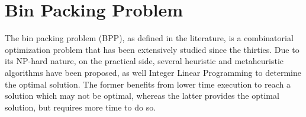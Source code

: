 \begin{comment}
    Another approach is to use linear goal programming, which allows to formulate a multi-objective problem into a standard linear programming problem by setting as constraints the target values for each of the multi-objective functions \cite[Chapter~4]{hillier2012introduction}. Although it might be a good approach to simplify a given problem, it requires a user to define a specific numeric goal for each of the objectives.
    
    Lastly, the pareto solution is another approach to multi-objective problems (MOP). This approach gathers the pareto front which consists of all optimal non-dominated solutions to a MOP. A solution $y$ is considered to dominate a solution $z$ if the evaluation of each objective function at y, is considered to be more optimal than when evaluated at $z$. In turn, a solution $y$ is considered to non-dominated by a solution $z$ when both are better than the other at one of the objective functions to be evaluated. These are the solutions that will make out the pareto front, and represents a set of trade-off solutions among the different objectives \cite{durillo2014multi}.
    
    Contrary to the previous alternatives, the pareto front does not require a user to determine preference beforehand, and provides with a tool precisely for preference discovery. To measure the quality of the pareto front, it is common to use a hypervolume measure, which determines the accuracy and diversity of a set of points. It is evaluated w.r.t. a single point, which is usually chosen as the maximum value of each objective function, and is more formally defined as the union of hypervolumes defined by each box to be defined between a point in the set and the reference point. This measure is more formally defined in \cite{guerreiro2020hypervolume}.

\end{comment}


\section{Bin Packing Problem}


The bin packing problem (BPP), as defined in the literature, is a combinatorial optimization problem that has been extensively studied since the thirties. Due to its NP-hard nature, on the practical side, several heuristic and metaheuristic algorithms have been proposed, as well Integer Linear Programming to determine the optimal solution. The former benefits from lower time execution to reach a solution which may not be optimal, whereas the latter provides the optimal solution, but requires more time to do so.

